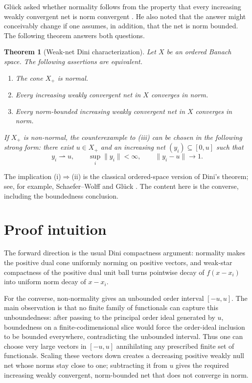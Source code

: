\documentclass[11pt]{article}
\newtheorem{theorem}{Theorem}[section]
\theoremstyle{remark}
\newcommand{\norm}[1]{\lVert #1\rVert}
\begin{document}
Gl\"uck asked whether normality follows from the property that every
increasing weakly convergent net is norm convergent
\cite[Open Problem~6.2]{Glueck2025}.  He also noted that the answer might
conceivably change if one assumes, in addition, that the net is norm
bounded.  The following theorem answers both questions.

\begin{theorem}[Weak-net Dini characterization]\label{thm:main}
Let $X$ be an ordered Banach space.  The following assertions are
equivalent.
\begin{enumerate}[label=\textup{(\roman*)}]
  \item The cone $X_+$ is normal.
  \item Every increasing weakly convergent net in $X$ converges in norm.
  \item Every norm-bounded increasing weakly convergent net in $X$
        converges in norm.
\end{enumerate}
If $X_+$ is non-normal, the counterexample to \textup{(iii)} can be chosen
in the following strong form: there exist $u\in X_+$ and an increasing net
$(y_i)\subseteq[0,u]$ such that
\[
  y_i\rightharpoonup u,
  \qquad
  \sup_i\norm{y_i}<\infty,
  \qquad
  \norm{y_i-u}\longrightarrow 1.
\]
\end{theorem}

The implication (i)$\Rightarrow$(ii) is the classical ordered-space version
of Dini's theorem; see, for example, Schaefer--Wolff
\cite[Section~V.4.3]{SchaeferWolff1999} and Gl\"uck
\cite[Corollary~4.2]{Glueck2025}.  The content here is the converse,
including the boundedness conclusion.

\section{Proof intuition}

The forward direction is the usual Dini compactness argument: normality makes
the positive dual cone uniformly norming on positive vectors, and weak-star
compactness of the positive dual unit ball turns pointwise decay of
$f(x-x_i)$ into uniform norm decay of $x-x_i$.

For the converse, non-normality gives an unbounded order interval
$[-u,u]$.  The main observation is that no finite family of functionals can
capture this unboundedness: after passing to the principal order ideal
generated by $u$, boundedness on a finite-codimensional slice would force the
order-ideal inclusion to be bounded everywhere, contradicting the unbounded
interval.  Thus one can choose very large vectors in $[-u,u]$ annihilating
any prescribed finite set of functionals.  Scaling these vectors down creates
a decreasing positive weakly null net whose norms stay close to one; subtracting
it from $u$ gives the required increasing weakly convergent, norm-bounded net
that does not converge in norm.
\end{document}
